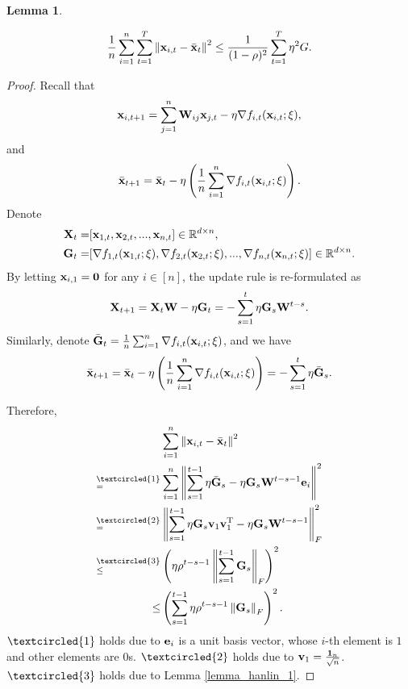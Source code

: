 \documentclass{article}
\newtheorem{Lemma}{\bf{Lemma}}
\begin{document}
\begin{Lemma}
\label{lemma_x_variance_norm_square}

\begin{align}
\nonumber
\frac{1}{n}\sum_{i=1}^n \sum_{t=1}^T \left\lVert{\bf x}_{i,t} - \bar{{\bf x}}_t\right\rVert^2 \le \frac{1}{(1-\rho)^2} \sum_{t=1}^T \eta^2 G.
\end{align}

\end{Lemma}
\begin{proof}


Recall that 
\begin{align}
\nonumber
{\bf x}_{i,t+1} = \sum_{j=1}^n {\bf W}_{ij}{\bf x}_{j,t} - \eta \nabla f_{i,t}({\bf x}_{i,t};\xi),
\end{align} and 
\begin{align}
\nonumber
\bar{{\bf x}}_{t+1} = \bar{{\bf x}}_t - \eta \left( \frac{1}{n}\sum_{i=1}^n \nabla f_{i,t}({\bf x}_{i,t};\xi) \right).
\end{align} Denote 
\begin{align}
\nonumber
{\bf X}_t = &  [{\bf x}_{1,t}, {\bf x}_{2,t}, ..., {\bf x}_{n,t}] \in \mathbb{R}^{d\times n}, \\ \nonumber
{\bf G}_t = & [\nabla f_{1,t}({\bf x}_{1,t};\xi), \nabla f_{2,t}({\bf x}_{2,t};\xi), ..., \nabla f_{n,t}({\bf x}_{n,t};\xi)] \in \mathbb{R}^{d\times n}.
\end{align} By letting ${\bf x}_{i,1} = {\bf 0}$ for any $i\in[n]$, the update rule is re-formulated as 
\begin{align}
\nonumber
{\bf X}_{t+1} = {\bf X}_t {\bf W} - \eta {\bf G}_t = - \sum_{s=1}^t \eta {\bf G}_s {\bf W}^{t-s}. 
\end{align} Similarly, denote $\bar{{\bf G}}_t = \frac{1}{n}\sum_{i=1}^n \nabla f_{i,t}({\bf x}_{i,t};\xi)$, and we have
\begin{align}
\bar{{\bf x}}_{t+1} = \bar{{\bf x}}_t - \eta \left( \frac{1}{n}\sum_{i=1}^n \nabla f_{i,t}({\bf x}_{i,t};\xi) \right) = - \sum_{s=1}^t \eta \bar{{\bf G}}_s. 
\end{align}


Therefore, 
\begin{align}
\nonumber
& \sum_{i=1}^n \lrnorm{\x_{i,t} - \bar{\x}_t}^2 \\ \nonumber
\refabovecir{=}{\textcircled{1}} & \sum_{i=1}^n \lrnorm{ \sum_{s=1}^{t-1} \eta \bar{\G}_s - \eta \G_s \W^{t-s-1}\e_i }^2   \\ \nonumber
\refabovecir{=}{\textcircled{2}} & \lrnorm{ \sum_{s=1}^{t-1} \eta \G_s\v_1 \v_1\Tr - \eta \G_s \W^{t-s-1} }^2_F   \\ \nonumber
\refabovecir{\le}{\textcircled{3}} & \lrincir{ \eta \rho^{t-s-1} \lrnorm{\sum_{s=1}^{t-1}\G_s}_F}^2 \\ \nonumber
\le & \lrincir{ \sum_{s=1}^{t-1} \eta \rho^{t-s-1} \lrnorm{\G_s}_F}^2.
\end{align} $\textcircled{1}$ holds due to ${\bf e}_i$ is a unit basis vector, whose $i$-th element is $1$ and other elements are $0$s. $\textcircled{2}$ holds due to ${\bf v}_1 = \frac{{\bf 1}_n}{\sqrt{n}}$. $\textcircled{3}$ holds due to Lemma \ref{lemma_hanlin_1}. 


\end{proof}
\end{document}

